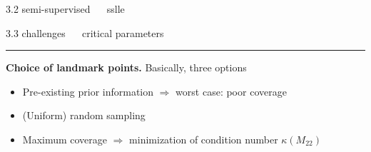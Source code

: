 \documentclass[11pt, compress, t, notes = noshow, xcolor = table, 
aspectratio = 1610]{beamer}
\newcommand{\highlight}[1]{\textcolor{highlightcol}{\textbf{#1}}}
\newcommand{\arritem}{\item[\highlight{$\rightarrow$}]}
\begin{document}
\begin{frame}{\textcolor{gray!90}{3.2 semi-supervised} ~~ sslle}
\end{frame}


\LARGE
\begin{frame}{\textcolor{gray!90}{3.3 challenges} ~~ critical parameters}
\normalsize
\vspace{-0.5cm}
\noindent \textcolor{gray!90}{\rule{\textwidth}{1pt}}
\smallskip

\textbf{Choice of landmark points.} Basically, three options

\begin{itemize}
  \arritem Pre-existing prior information $\Rightarrow$ worst case: poor 
  coverage
  \arritem (Uniform) random sampling
  \arritem Maximum coverage $\Rightarrow$ minimization of condition number 
  $\kappa(M_{22})$
\end{itemize}



\end{frame}
\end{document}
